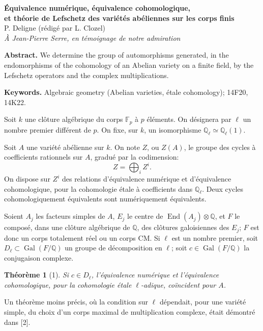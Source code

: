 \documentclass[11pt]{article}
\newcommand{\Q}{\mathbb Q}
\newcommand{\Fp}{\mathbb F_p}
\newcommand{\Gal}{\operatorname{Gal}}
\newcommand{\End}{\operatorname{End}}
\theoremstyle{deligne}
\newtheorem*{theorem*}{Théorème}
\newcommand{\heading}[1]{\vspace{0.7em}\noindent{\bfseries #1}\quad}
\begin{document}
\begin{center}
{\Large\bfseries Équivalence numérique, équivalence cohomologique,\\
et théorie de Lefschetz des variétés abéliennes sur les corps finis}\\[0.6em]
{\large P. Deligne (rédigé par L. Clozel)}\\[0.35em]
{\itshape À Jean-Pierre Serre, en témoignage de notre admiration}
\end{center}

\textbf{Abstract.} We determine the group of automorphisms generated, in the endomorphisms of the cohomology of an Abelian variety on a finite field, by the Lefschetz operators and the complex multiplications.

\textbf{Keywords.} Algebraic geometry (Abelian varieties, étale cohomology); 14F20, 14K22.


\heading{1.}
Soit $k$ une clôture algébrique du corps $\Fp$ à $p$ éléments. On désignera par $\ell$ un nombre premier différent de $p$. On fixe, sur $k$, un isomorphisme $\Q_\ell\simeq \Q_\ell(1)$.

Soit $A$ une variété abélienne sur $k$. On note $Z$, ou $Z(A)$, le groupe des cycles à coefficients rationnels sur $A$, gradué par la codimension:
\[
 Z=\bigoplus_i Z^i .
\]
On dispose sur $Z^i$ des relations d'équivalence numérique et d'équivalence cohomologique, pour la cohomologie étale à coefficients dans $\Q_\ell$. Deux cycles cohomologiquement équivalents sont numériquement équivalents.

Soient $A_j$ les facteurs simples de $A$, $E_j$ le centre de $\End(A_j)\otimes\Q$, et $F$ le composé, dans une clôture algébrique de $\Q$, des clôtures galoisiennes des $E_j$; $F$ est donc un corps totalement réel ou un corps CM. Si $\ell$ est un nombre premier, soit $D_\ell\subset \Gal(F/\Q)$ un groupe de décomposition en $\ell$; soit $c\in\Gal(F/\Q)$ la conjugaison complexe.

\begin{theorem*}[1]
Si $c\in D_\ell$, l'équivalence numérique et l'équivalence cohomologique, pour la cohomologie étale $\ell$-adique, coïncident pour $A$.
\end{theorem*}

Un théorème moins précis, où la condition sur $\ell$ dépendait, pour une variété simple, du choix d'un corps maximal de multiplication complexe, était démontré dans [2].
\end{document}
